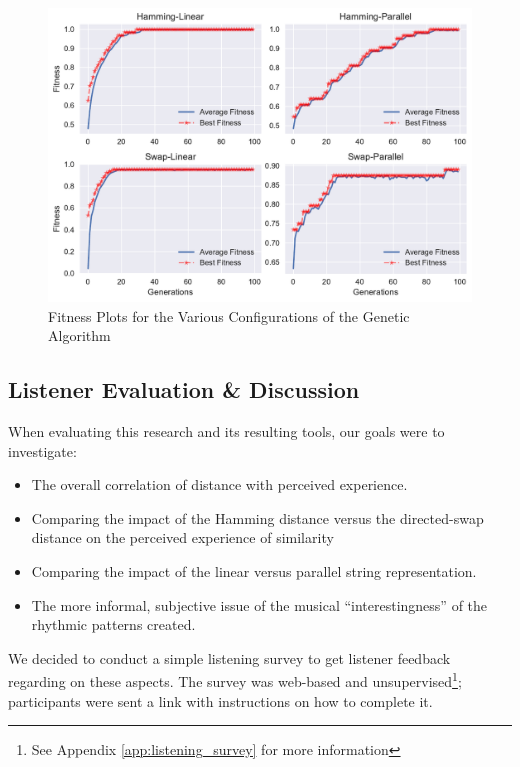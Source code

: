 \begin{figure}
	\begin{center}
		\includegraphics[width=\figSizeHundred]{ch03_symbolic/figures/best_average_fitness.pdf}
	\end{center}
	\caption[Fitness Plots for the Various Configurations of the Genetic Algorithm]{Fitness Plots for the Various Configurations of the Genetic Algorithm}
	\label{fig:genetic}
\end{figure}

\subsection{Listener Evaluation \& Discussion}

When evaluating this research and its resulting tools, our goals were to investigate:

\begin{itemize}
	\item The overall correlation of distance with perceived experience.
	\item Comparing the impact of the Hamming distance versus the directed-swap distance on the perceived experience of similarity
	\item Comparing the impact of the linear versus parallel string representation.
	\item The more informal, subjective issue of the musical ``interestingness'' of the rhythmic patterns created.
\end{itemize}


We decided to conduct a simple listening survey to get listener feedback regarding on these aspects. The survey was web-based and unsupervised\footnote{See Appendix \ref{app:listening_survey} for more information}; participants were sent a link with instructions on how to complete it. 

